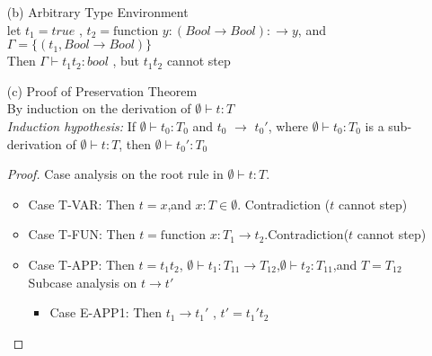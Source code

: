 \documentclass{article}
\begin{document}
\begin{description}
\begin{enumerate}
\begin{proof}
\begin{itemize}
\begin{itemize}
                                        Then $t \rightarrow t' = v_1 t_2'$ by E-APP2
                                    \item Case Both $t_1$ and $t_2$ are values\\
                                        Then, $t \rightarrow t' = [x \rightarrow v_2]t_{12}$ by E-APPBETA
                                \end{itemize}
                        \end{itemize}
                    \end{proof}
                \item[(b)]{Arbitrary Type Environment}\\ let $t_1 = true$ , $t_2 = \text{function \ } y:(Bool \rightarrow Bool): \rightarrow  y $, and $\Gamma = \{(t_1,Bool \rightarrow Bool)\}$\\
                   Then $\Gamma \vdash t_1 t_2: bool$ , but $t_1 t_2$ cannot step
                \item[(c)]{Proof of Preservation Theorem}\\
                    By induction on the derivation of $\emptyset \vdash t:T$\\
                    \textit{Induction hypothesis:} If $\emptyset \vdash t_0:T_0$ and $t_0$ $\rightarrow$ $t_0'$, where $\emptyset \vdash t_0:T_0$ is a sub-derivation of $\emptyset \vdash t:T$, then $\emptyset \vdash t_0':T_0$
                    \begin{proof}
                        Case analysis on the root rule in $\emptyset \vdash t:T$.
                        \begin{itemize}
                            \item Case T-VAR: Then $t = x$,and $x:T \in \emptyset$. Contradiction ($t$ cannot step)
                            \item Case T-FUN: Then $t = \text{function\ } x:T_1 \rightarrow t_2 $.Contradiction($t$ cannot step)
                            \item Case T-APP: Then $t = t_1 t_2$, $\emptyset \vdash t_1: T_{11} \rightarrow T_{12}$,\space  $\emptyset \vdash t_2:T_{11}$,\space and $T=T_{12}$\\
                            Subcase analysis on $t \rightarrow t'$
                            \begin{itemize}
                                \item Case E-APP1: Then $t_1 \rightarrow t_1'$ , $t' = t_1't_2$\\

\end{itemize}
\end{itemize}
\end{proof}
\end{enumerate}
\end{description}
\end{document}
